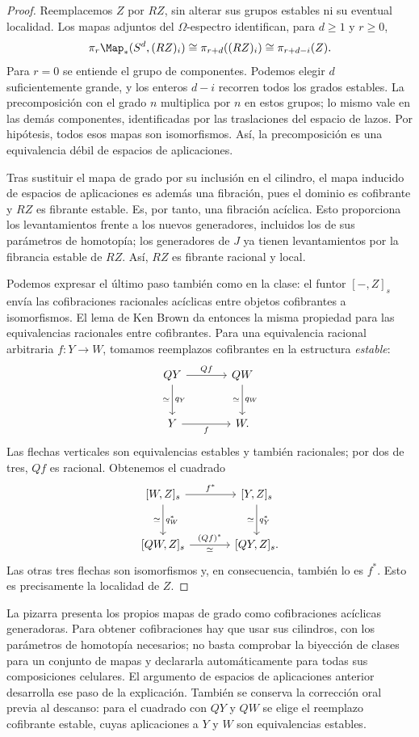 \begin{proof}
Reemplacemos $Z$ por $RZ$, sin alterar sus grupos estables ni su eventual localidad. Los mapas adjuntos del $\Omega$-espectro identifican, para $d\ge1$ y $r\ge0$,
\[
\pi_r\Map_*(S^d,(RZ)_i)
\cong\pi_{r+d}((RZ)_i)
\cong\pi_{r+d-i}(Z).
\]
Para $r=0$ se entiende el grupo de componentes. Podemos elegir $d$ suficientemente grande, y los enteros $d-i$ recorren todos los grados estables. La precomposición con el grado $n$ multiplica por $n$ en estos grupos; lo mismo vale en las demás componentes, identificadas por las traslaciones del espacio de lazos. Por hipótesis, todos esos mapas son isomorfismos. Así, la precomposición es una equivalencia débil de espacios de aplicaciones.

Tras sustituir el mapa de grado por su inclusión en el cilindro, el mapa inducido de espacios de aplicaciones es además una fibración, pues el dominio es cofibrante y $RZ$ es fibrante estable. Es, por tanto, una fibración acíclica. Esto proporciona los levantamientos frente a los nuevos generadores, incluidos los de sus parámetros de homotopía; los generadores de $J$ ya tienen levantamientos por la fibrancia estable de $RZ$. Así, $RZ$ es fibrante racional y local.

Podemos expresar el último paso también como en la clase: el funtor $[-,Z]_s$ envía las cofibraciones racionales acíclicas entre objetos cofibrantes a isomorfismos. El lema de Ken Brown da entonces la misma propiedad para las equivalencias racionales entre cofibrantes. Para una equivalencia racional arbitraria $f\colon Y\to W$, tomamos reemplazos cofibrantes en la estructura \emph{estable}:
\[
\begin{tikzcd}[column sep=large,row sep=large]
QY\arrow[r,"Qf"]\arrow[d,"q_Y","\simeq"']
&QW\arrow[d,"q_W","\simeq"']\\
Y\arrow[r,"f"']&W.
\end{tikzcd}
\]
Las flechas verticales son equivalencias estables y también racionales; por dos de tres, $Qf$ es racional. Obtenemos el cuadrado
\[
\begin{tikzcd}[column sep=large,row sep=large]
{[W,Z]_s}\arrow[r,"f^*"]\arrow[d,"q_W^*","\simeq"']
&{[Y,Z]_s}\arrow[d,"q_Y^*","\simeq"']\\
{[QW,Z]_s}\arrow[r,"(Qf)^*","\simeq"']&{[QY,Z]_s}.
\end{tikzcd}
\]
Las otras tres flechas son isomorfismos y, en consecuencia, también lo es $f^*$. Esto es precisamente la localidad de $Z$.
\end{proof}

\begin{nota}
La pizarra presenta los propios mapas de grado como cofibraciones acíclicas generadoras. Para obtener cofibraciones hay que usar sus cilindros, con los parámetros de homotopía necesarios; no basta comprobar la biyección de clases para un conjunto de mapas y declararla automáticamente para todas sus composiciones celulares. El argumento de espacios de aplicaciones anterior desarrolla ese paso de la explicación. También se conserva la corrección oral previa al descanso: para el cuadrado con $QY$ y $QW$ se elige el reemplazo cofibrante estable, cuyas aplicaciones a $Y$ y $W$ son equivalencias estables.
\end{nota}

